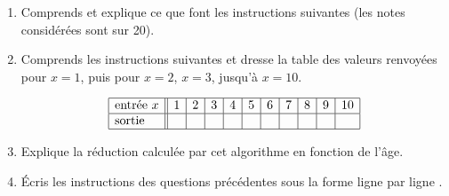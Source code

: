 \documentclass[class=report,crop=false, 12pt]{standalone}
\begin{document}
\begin{activite}
\sauteligne
\begin{enumerate}
  \item Comprends et explique ce que font les instructions suivantes (les notes considérées sont sur 20).
  
  \item Comprends les instructions suivantes et dresse la table des valeurs renvoyées pour $x=1$, puis pour $x=2$, $x=3$, jusqu'à $x=10$.
  
  
    $$\begin{array}{|l||c|c|c|c|c|c|c|c|c|c|c}
  \hline
  \text{entrée } x & 1&2&3&4&5&6&7&8&9&10 \\
  \hline
  \text{sortie } & &&&&&&&&& \\
  \hline
  \end{array}  
  $$ 
  
  
  \item Explique la réduction calculée par cet algorithme en fonction de l'âge.
  



  \item Écris les instructions des questions précédentes sous la forme \og ligne par ligne \fg{}. 
  
  
\end{enumerate}
\end{activite}
\end{document}
